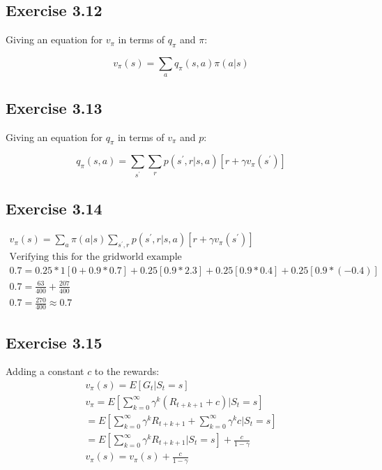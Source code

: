 \subsection{Exercise 3.12}
Giving an equation for $v_\pi$ in terms of $q_\pi$ and $\pi$:

\begin{equation}
  v_\pi(s) = \sum_a q_\pi(s,a) \pi(a|s)
\end{equation}

\subsection{Exercise 3.13}
Giving an equation for $q_\pi$ in terms of $v_\pi$ and $p$: 

\begin{equation}
  q_\pi(s,a) = \sum_{s^\prime} \sum_r p(s^\prime,r|s,a)[r+\gamma v_\pi(s^\prime)]
\end{equation}

\subsection{Exercise 3.14}
\begin{gather}
  v_\pi(s) = \sum_{a} \pi(a|s) \sum_{s^\prime,r} p(s^\prime, r | s,a)[r + \gamma v_\pi(s^\prime)] \\
  \text{Verifying this for the gridworld example} \\
  0.7 = 0.25*1[0 + 0.9*0.7] + 0.25[0.9*2.3] + 0.25[0.9*0.4] + 0.25[0.9*(-0.4)] \\
  0.7 = \frac{63}{400} + \frac{207}{400} \\
  0.7 =  \frac{270}{400} \approx 0.7
\end{gather}

\subsection{Exercise 3.15}
Adding a constant $c$ to the rewards:
\begin{gather}
  v_\pi(s) = E[G_t | S_t=s]\\ 
  v_\pi = E[\sum_{k=0}^\infty \gamma^k (R_{t+k+1} + c) | S_t = s] \\
  = E[\sum_{k=0}^\infty \gamma^k R_{t+k+1} + \sum_{k=0}^\infty \gamma^k c | S_t = s] \\
  = E[\sum_{k=0}^{\infty} \gamma^k R_{t+k+1}|S_t = s] + \frac{c}{1-\gamma} \\
  v_\pi(s) = v_\pi(s)+ \frac{c}{1-\gamma}
\end{gather}

